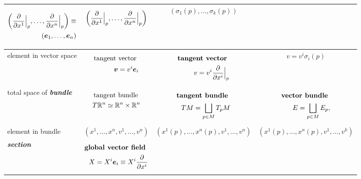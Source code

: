 \documentclass[11pt]{article}
\begin{document}
\begin{itemize}
\begin{table}[h!]
\begin{tabularx}{1\textwidth} { 
  | >{\raggedright\arraybackslash} m{2cm}
  | >{\centering\arraybackslash}X
  | >{\centering\arraybackslash}X
  | >{\centering\arraybackslash}X  | }
\begin{center}
 \begin{align*}
 \left(\dfrac{\partial}{\partial x^{1}}\Bigr|_{p}, \ldots, \dfrac{\partial}{\partial x^{n}}\Bigr|_{p}\right)  \equiv  \\
(\boldsymbol{e}_1, \ldots, \boldsymbol{e}_{n})
\end{align*} 
 \end{center} &  \begin{align*}
 \left(\dfrac{\partial}{\partial x^{1}}\Bigr|_{p}, \ldots, \dfrac{\partial}{\partial x^{n}}\Bigr|_{p}\right)
\end{align*} &   \begin{align*}
 (\sigma_1(p), \ldots, \sigma_{k}(p))
\end{align*} \\
\hline
element in vector space &  \begin{align*}
\text{tangent vector }\\
 \boldsymbol{v} = v^{i}\boldsymbol{e}_{i}
 \end{align*}  & \begin{align*} 
\text{\textbf{tangent vector} }\\
  v = v^{i}\dfrac{\partial}{\partial x^{i}}\Bigr|_{p}
 \end{align*}  & \begin{align*} 
 v = v^{i}\sigma_{i}(p)
 \end{align*}\\
\hline
total space of \emph{\textbf{bundle}} & \begin{align*}
\text{tangent bundle }\\
 T{\mathbb R}^{n} \simeq  {\mathbb R}^{n} \times {\mathbb R}^{n}
 \end{align*}  & \begin{align*}
 \text{\textbf{tangent bundle} }\\
TM =  \bigsqcup_{p\in M}T_{p}M
 \end{align*} 
 & 
\begin{align*}
 \text{\textbf{vector bundle} }\\
E =  \bigsqcup_{p\in M}E_{p}, 
 \end{align*}\\
\hline
element in bundle & $(x^1,\ldots, x^{n}, v^1, \ldots, v^{n})$ &
$(x^1(p), \ldots, x^{n}(p),  v^1, \ldots, v^{n})$
& 
$(x^1(p), \ldots, x^{n}(p),  v^1, \ldots, v^{k})$ \\
\hline
\emph{\textbf{section}} & 
\begin{align*}
\text{\textbf{global vector field} }\\
X = X^{i}\mb{e}_{i} \equiv X^{i}\partdiff{}{x^{i}}

\end{align*}
\end{tabularx}
\end{table}
\end{itemize}
\end{document}
